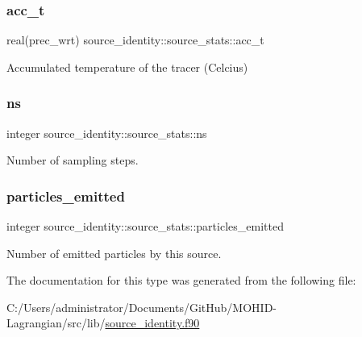 \subsubsection{\texorpdfstring{acc\+\_\+t}{acc\_t}}
{\footnotesize\ttfamily real(prec\+\_\+wrt) source\+\_\+identity\+::source\+\_\+stats\+::acc\+\_\+t\hspace{0.3cm}{\ttfamily [private]}}



Accumulated temperature of the tracer (Celcius) 

\mbox{\label{structsource__identity_1_1source__stats_a0d1e978cf3224049d1c15b23b8d16fa7}} 
\subsubsection{\texorpdfstring{ns}{ns}}
{\footnotesize\ttfamily integer source\+\_\+identity\+::source\+\_\+stats\+::ns\hspace{0.3cm}{\ttfamily [private]}}



Number of sampling steps. 

\mbox{\label{structsource__identity_1_1source__stats_a1b11065093e55320520604392399d1c9}} 
\subsubsection{\texorpdfstring{particles\+\_\+emitted}{particles\_emitted}}
{\footnotesize\ttfamily integer source\+\_\+identity\+::source\+\_\+stats\+::particles\+\_\+emitted\hspace{0.3cm}{\ttfamily [private]}}



Number of emitted particles by this source. 



The documentation for this type was generated from the following file\+:\begin{DoxyCompactItemize}
\item 
C\+:/\+Users/administrator/\+Documents/\+Git\+Hub/\+M\+O\+H\+I\+D-\/\+Lagrangian/src/lib/\hyperlink{source__identity_8f90}{source\+\_\+identity.\+f90}\end{DoxyCompactItemize}
